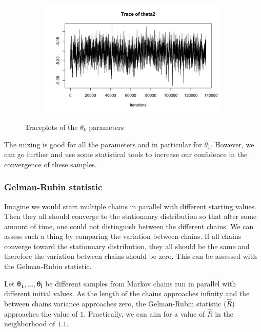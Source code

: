 \begin{figure}[H]
\begin{subfigure}{0.3\textwidth}
	\end{subfigure}
	\begin{subfigure}{0.3\textwidth}
		\centering
		\includegraphics{figures/metropolis_cw/metropolis_cw_traceplot_theta2}
	\end{subfigure}
	\caption{Traceplots of the $\theta_k$ parameters}
	\label{fig:metropolis-cw-traceplots}
\end{figure}

The mixing is good for all the parameters and in particular for $\theta_1$. However, we can go further and use some statistical tools to increase our confidence in the convergence of these samples.

\subsubsection*{Gelman-Rubin statistic}

Imagine we would start multiple chains in parallel with different starting values. Then they all should converge to the stationnary distribution so that after some amount of time, one could not distinguish between the different chains. We can assess such a thing by comparing the variation between chains. If all chains converge toward the stationnary distribution, they all should be the same and therefore the variation between chains should be zero. This can be assessed with the Gelman-Rubin statistic.

Let $\bm{\theta_1},\dots,\bm{\theta_l}$ be different samples from Markov chains run in parallel with different initial values. As the length of the chains approaches infinity and the between chains variance approaches zero, the Gelman-Rubin statistic ($\hat{R}$) approaches the value of $1$. Practically, we can aim for a value of $\hat{R}$ in the neighborhood of $1.1$.

